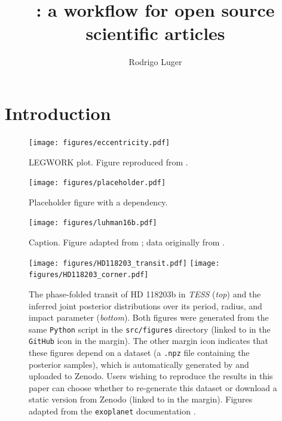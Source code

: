 \documentclass[twocolumn]{aastex631}
\begin{document}
\title{\showyourwork: a workflow for open source scientific articles}

\author[0000-0002-0296-3826]{Rodrigo Luger}

\begin{abstract}
    \blindtext
\end{abstract}

\section{Introduction}

\begin{figure}[ht!]
    \begin{centering}
        \texttt{[image: figures/eccentricity.pdf]}
        \caption{
            LEGWORK plot. Figure reproduced from \citet{Wagg2021}.
        }
        \label{fig:eccentricity}
    \end{centering}
\end{figure}

\begin{figure}[ht!]
    \begin{centering}
        \texttt{[image: figures/placeholder.pdf]}
        \caption{
            Placeholder figure with a dependency.
        }
        \label{fig:placeholder}
    \end{centering}
\end{figure}

\begin{figure}[ht!]
    \begin{centering}
        \texttt{[image: figures/luhman16b.pdf]}
        \caption{
            Caption. Figure adapted from \citet{Luger2021}; data originally from \citet{Crossfield2014}.
        }
        \label{fig:luhman16b}
    \end{centering}
\end{figure}

\begin{figure}[ht!]
    \begin{centering}
        \texttt{[image: figures/HD118203\_transit.pdf]}
        \texttt{[image: figures/HD118203\_corner.pdf]}
        \caption{
            The phase-folded transit of HD 118203b in \emph{TESS} (\emph{top}) and the inferred joint posterior distributions over its period, radius, and impact parameter (\emph{bottom}). 
            Both figures were generated from the same \texttt{Python} script in the \texttt{src/figures} directory (linked to in the \texttt{GitHub} icon in the margin). The other margin icon indicates that these figures depend on a dataset (a \texttt{.npz} file containing the posterior samples), which is automatically generated by \showyourwork and uploaded to Zenodo. 
            Users wishing to reproduce the results in this paper can choose whether to re-generate this dataset or download a static version from Zenodo (linked to in the margin).
            Figures adapted from the \texttt{exoplanet} documentation \citep{ForemanMackey2021}.
        }
        \label{fig:HD118203}
    \end{centering}
\end{figure}
\end{document}
